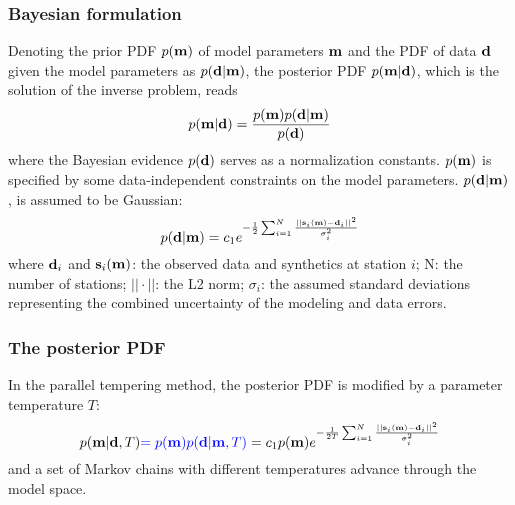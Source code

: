 \subsubsection{Bayesian formulation}
Denoting the prior PDF $p(\mathbf{m})$ of model parameters $\mathbf{m}$ and
the PDF of data $\mathbf{d}$ given the model parameters as $p(\mathbf{d} | \mathbf{m})$,
the posterior PDF $p(\mathbf{m} | \mathbf{d})$,
which is the solution of the inverse problem, reads
\[ p(\mathbf{m} | \mathbf{d}) = \frac{p(\mathbf{m}) p(\mathbf{d} | \mathbf{m})}{p(\mathbf{d})} \]
where the Bayesian evidence $p(\mathbf{d})$ serves as a normalization constants.
$p(\mathbf{m})$ is specified by some data-independent
constraints on the model parameters.
$p(\mathbf{d} | \mathbf{m})$, is assumed to be Gaussian:
\[ p(\mathbf{d} | \mathbf{m}) = c_1 e^{ - \frac{1}{2} \sum_{i = 1}^N
  \frac{|| \mathbf{s}_i(\mathbf{m}) - \mathbf{d}_i ||^2}{\sigma_i^2} } \]
where $\mathbf{d}_i$ and $\mathbf{s}_i(\mathbf{m})$: the observed data and synthetics
at station $i$; N: the number of stations; $||\cdot||$: the L2 norm;
$\sigma_i$: the assumed standard deviations representing
the combined uncertainty of the modeling and data errors.

\subsubsection{The posterior PDF}
In the parallel tempering method,
the posterior PDF is modified by a parameter temperature $T$:
\[ p(\mathbf{m} | \mathbf{d}, T) {\color{blue} = p(\mathbf{m}) p(\mathbf{d} | \mathbf{m}, T) }
  = c_1 p(\mathbf{m}) e^{ - \frac{1}{2 T} \sum_{i = 1}^N
  \frac{|| \mathbf{s}_i(\mathbf{m}) - \mathbf{d}_i ||^2}{\sigma_i^2} } \]
and a set of Markov chains with different temperatures
advance through the model space.

